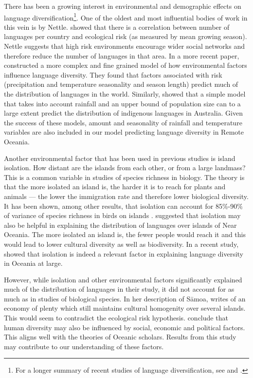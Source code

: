 \documentclass[a4paper,10pt]{article} %
\begin{document}
There has been a growing interest in environmental and demographic effects on language diversification\footnote{For a longer summary of recent studies of language diversification, see \citet{gavin2013toward} and \citet{greenhill2015demographic}.}. One of the oldest and most influential bodies of work in this vein is by Nettle. \citet{NETTLE1998} showed that there is a correlation between number of languages per country and ecological risk (as measured by mean growing season). Nettle suggests that high risk environments encourage wider social networks and therefore reduce the number of languages in that area. In a more recent paper, \citet{hua2019ecological} constructed a more complex and fine grained model of how environmental factors influence language diversity. They found that factors associated with risk (precipitation and temperature seasonality and season length) predict much of the distribution of languages in the world. Similarly, \citet{gavin2017process} showed that a simple model that takes into account rainfall and an upper bound of population size can to a large extent predict the distribution of indigenous languages in Australia. Given the success of these models, amount and seasonality of rainfall and temperature variables are also included in our model predicting language diversity in Remote Oceania. 

Another environmental factor that has been used in previous studies is island isolation. How distant are the islands from each other, or from a large landmass? This is a common variable in studies of species richness  in biology. The theory is that the more isolated an island is, the harder it is to reach for plants and animals --- the lower the immigration rate and therefore lower biological diversity. It has been shown, among other results, that isolation can account for 85\%-90\% of variance of species richness in birds on islands \citep{kalmar2006global}. \citet{terrell1976island} suggested that isolation may also be helpful in explaining the distribution of languages over islands of Near Oceania. The more isolated an island is, the fewer people would reach it and this would lead to lower cultural diversity as well as biodiversity. In a recent study, \citet{gavin2012island} showed that isolation is indeed a relevant factor in explaining language diversity in Oceania at large. 

However, while isolation and other environmental factors significantly explained much of the distribution of languages in their study, it did not account for as much as in studies of biological species. In her description of S\={a}moa, \citet[287]{mead1937samoans} writes of an economy of plenty which still maintains cultural homogenity over several islands. This would seem to contradict the ecological risk hypothesis. \citet{gavin2012island} conclude that human diversity may also be influenced by social, economic and political factors. This aligns well with the theories of Oceanic scholars. Results from this study may contribute to our understanding of these factors.
\end{document}
